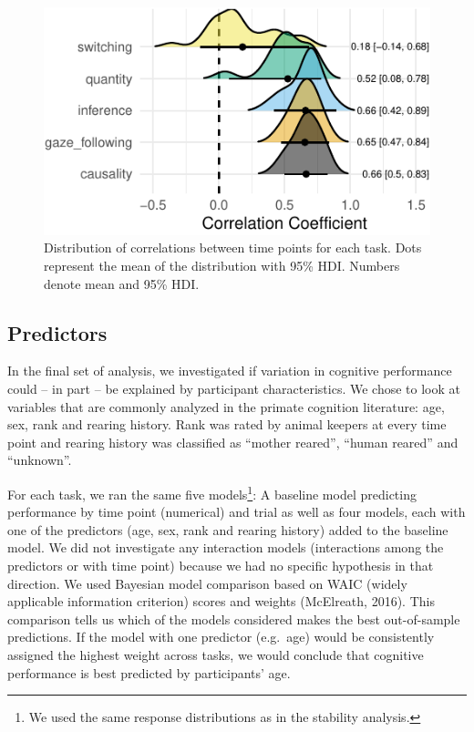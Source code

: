 \documentclass[10pt, letterpaper]{article}
\newenvironment{CodeChunk}{}{}
\begin{document}
\begin{CodeChunk}
\begin{figure}[H]

{\centering \includegraphics{figs/relplot-1} 

}

\caption[Distribution of correlations between time points for each task]{Distribution of correlations between time points for each task. Dots represent the mean of the distribution with 95\% HDI. Numbers denote mean and 95\% HDI.}\label{fig:relplot}
\end{figure}
\end{CodeChunk}

\hypertarget{predictors}{%
\subsection{Predictors}\label{predictors}}

In the final set of analysis, we investigated if variation in cognitive
performance could -- in part -- be explained by participant
characteristics. We chose to look at variables that are commonly
analyzed in the primate cognition literature: age, sex, rank and rearing
history. Rank was rated by animal keepers at every time point and
rearing history was classified as ``mother reared'', ``human reared''
and ``unknown''.

For each task, we ran the same five models\footnote{We used the same
  response distributions as in the stability analysis.}: A baseline
model predicting performance by time point (numerical) and trial as well
as four models, each with one of the predictors (age, sex, rank and
rearing history) added to the baseline model. We did not investigate any
interaction models (interactions among the predictors or with time
point) because we had no specific hypothesis in that direction. We used
Bayesian model comparison based on WAIC (widely applicable information
criterion) scores and weights (McElreath, 2016). This comparison tells
us which of the models considered makes the best out-of-sample
predictions. If the model with one predictor (e.g.~age) would be
consistently assigned the highest weight across tasks, we would conclude
that cognitive performance is best predicted by participants' age.
\end{document}
